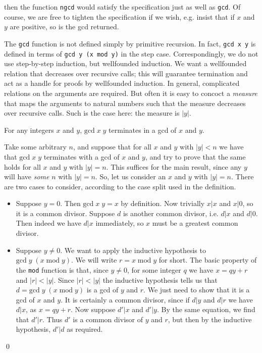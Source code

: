 \noindent then the function {\tt ngcd} would satisfy the specification just as
well as {\tt gcd}. Of course, we are free to tighten the specification if we
wish, e.g. insist that if $x$ and $y$ are positive, so is the gcd returned.

The {\tt gcd} function is not defined simply by primitive recursion. In
fact, {\tt gcd x y} is defined in terms of {\tt gcd y (x mod y)} in the step
case. Correspondingly, we do not use step-by-step induction, but wellfounded
induction. We want a wellfounded relation that decreases over recursive calls;
this will guarantee termination and act as a handle for proofs by wellfounded
induction. In general, complicated relations on the arguments are required. But
often it is easy to concoct a {\em measure} that maps the arguments to natural
numbers such that the measure decreases over recursive calls. Such is the case
here: the measure is $|y|$.

\begin{theorem} For any integers $x$ and $y$, $\mbox{gcd}\; x\; y$ terminates
in a gcd of $x$ and $y$.

\proof Take some arbitrary $n$, and suppose that for all $x$ and $y$ with $|y|
< n$ we have that $\mbox{gcd}\; x\; y$ terminates with a gcd of $x$ and $y$,
and try to prove that the same holds for all $x$ and $y$ with $|y| = n$. This
suffices for the main result, since any $y$ will have {\em some} $n$ with $|y|
= n$. So, let us consider an $x$ and $y$ with $|y| = n$. There are two cases to
consider, according to the case split used in the definition.

\begin{itemize}

\item Suppose $y = 0$. Then $\mbox{gcd}\; x\; y = x$ by definition. Now
trivially $x | x$ and $x | 0$, so it is a common divisor. Suppose $d$ is
another common divisor, i.e. $d | x$ and $d | 0$. Then indeed we have $d | x$
immediately, so $x$ must be a greatest common divisor.

\item Suppose $y \not= 0$. We want to apply the inductive hypothesis to
$\mbox{gcd}\; y\; (x\; \mbox{mod}\; y)$. We will write $r = x\; \mbox{mod}\; y$
for short. The basic property of the {\tt mod} function is that, since $y \not=
0$, for some integer $q$ we have $x = q y + r$ and $|r| < |y|$. Since $|r| <
|y|$ the inductive hypothesis tells us that $d = \mbox{gcd}\; y\; (x\;
\mbox{mod}\; y)$ is a gcd of $y$ and $r$. We just need to show that it is a gcd
of $x$ and $y$. It is certainly a common divisor, since if $d | y$ and $d | r$
we have $d | x$, as $x = q y + r$. Now suppose $d' | x$ and $d' | y$. By the
same equation, we find that $d' | r$. Thus $d'$ is a common divisor of $y$ and
$r$, but then by the inductive hypothesis, $d' | d$ as required.

\end{itemize}

\qed

\end{theorem}

